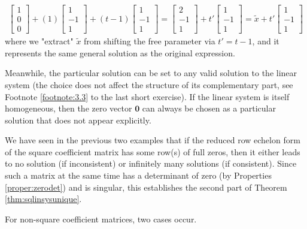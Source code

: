 {\begin{align*}
\begin{bmatrix}
1 \\
0 \\
0
\end{bmatrix}
+ (1)
\begin{bmatrix}
1 \\
-1 \\
1
\end{bmatrix}
+
(t-1)
\begin{bmatrix}
1 \\
-1 \\
1
\end{bmatrix}
=
\begin{bmatrix}
2 \\
-1 \\
1
\end{bmatrix}
+
t'
\begin{bmatrix}
1 \\
-1 \\
1
\end{bmatrix}
= \tilde{x} + t'
\begin{bmatrix}
1 \\
-1 \\
1
\end{bmatrix}
\end{align*}
where we "extract" $\tilde{x}$ from shifting the free parameter via $t' = t-1$, and it represents the same general solution as the original expression.}\footnotemark\par
Meanwhile, the particular solution can be set to any valid solution to the linear system (the choice does not affect the structure of its complementary part, see Footnote \ref{footnote:3.3} to the last short exercise). If the linear system is itself homogeneous, then the zero vector $\textbf{0}$ can always be chosen as a particular solution that does not appear explicitly.\par
We have seen in the previous two examples that if the reduced row echelon form of the square coefficient matrix has some row(s) of full zeros, then it either leads to no solution (if inconsistent) or infinitely many solutions (if consistent). Since such a matrix at the same time has a determinant of zero (by Properties \ref{proper:zerodet}) and is singular, this establishes the second part of Theorem \ref{thm:sqlinsysunique}. \par
For non-square coefficient matrices, two cases occur.
